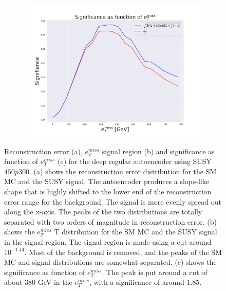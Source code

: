 \begin{figure}[!htb]
    \hfill 
    \begin{subfigure}{.49\textwidth}
        \includegraphics[width=\textwidth]{Figures/AE_testing/big/2lep/significance_etmiss_450p0p0300_-1.4360553938127363.pdf}
        \caption{}
        \label{fig:AE_2lep_big_signi_450}
    \end{subfigure}
    \hfill      
    \caption[2lep deep network | $450p300$ | AE]{Reconstruction error (a), $e_T^{miss}$ signal region (b) and significance as function of 
    $e_T^{miss}$ (c) for the deep regular autoencoder using SUSY $450p300$. 
    (a) shows the reconstruction error distribution for the SM MC and the SUSY signal. 
    The autoencoder produces a slope-like shape that is highly shifted to the lower end of the reconstruction error range
for the background. The signal is more evenly spread out along the x-axis. The peaks of the two distributions are totally separated
with two orders of magnitude in reconstruction error. (b) shows the $e_T^{miss}$
T distribution for the SM MC and the SUSY signal in the signal region. The signal region is made using a cut around
$10^{-1.44}$. Most of the background is removed, and the peaks of the SM MC and signal distributions are
somewhat separated. (c) shows the significance as function of $e_T^{miss}$. The peak is put 
around a cut of about 380 GeV in the $e_T^{miss}$, with a significance of around $1.85$.}
    \label{fig:AE_2lep_big_rec_sig_signi_450}
\end{figure}



